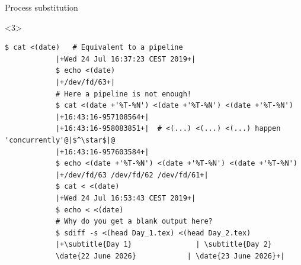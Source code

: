 \begin{frame}[fragile]{Process substitution}
\begin{onlyenv}
\begin{onlyenv}
        \end{onlyenv}
    \end{onlyenv}
    \begin{onlyenv}<3>
        \begin{lstlisting}[style=MyBash, aboveskip=0mm, xleftmargin=2mm, xrightmargin=0mm]
            $ cat <(date)   # Equivalent to a pipeline
            |+Wed 24 Jul 16:37:23 CEST 2019+|
            $ echo <(date)
            |+/dev/fd/63+|
            # Here a pipeline is not enough!
            $ cat <(date +'%T-%N') <(date +'%T-%N') <(date +'%T-%N')
            |+16:43:16-957108564+|
            |+16:43:16-958083851+|  # <(...) <(...) <(...) happen 'concurrently'@|$^\star$|@
            |+16:43:16-957603584+|
            $ echo <(date +'%T-%N') <(date +'%T-%N') <(date +'%T-%N')
            |+/dev/fd/63 /dev/fd/62 /dev/fd/61+|
            $ cat < <(date)
            |+Wed 24 Jul 16:53:43 CEST 2019+|
            $ echo < <(date)
            # Why do you get a blank output here?
            $ sdiff -s <(head Day_1.tex) <(head Day_2.tex)
            |+\subtitle{Day 1}               | \subtitle{Day 2}
            \date{22 June 2026}            | \date{23 June 2026}+|
        \end{lstlisting}
    \end{onlyenv}
    \PrepareURLsymbol[PB]
\end{frame}
